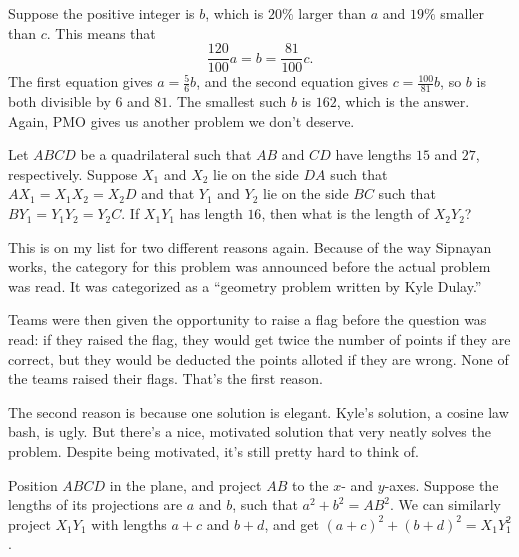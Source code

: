 \documentclass[11pt,paper=letter]{scrartcl}
\begin{document}
Suppose the positive integer is $b$, which is $20\%$ larger than $a$ and $19\%$ smaller than $c$. This means that
$$\frac{120}{100}a = b = \frac{81}{100}c.$$
The first equation gives $a = \frac56 b$, and the second equation gives $c = \frac{100}{81}b$, so $b$ is both divisible by $6$ and $81$. The smallest such $b$ is $162$, which is the answer. Again, PMO gives us another problem we don't deserve. 

\begin{probboxed}
   Let $ABCD$ be a quadrilateral such that $AB$ and $CD$ have lengths $15$ and $27$, respectively. Suppose $X_1$ and $X_2$ lie on the side $DA$ such that $AX_1 = X_1X_2 = X_2D$ and that $Y_1$ and $Y_2$ lie on the side $BC$ such that $BY_1 = Y_1Y_2 = Y_2C$. If $X_1Y_1$ has length $16$, then what is the length of $X_2Y_2$?
\end{probboxed}

This is on my list for two different reasons again. Because of the way Sipnayan works, the category for this problem was announced before the actual problem was read. It was categorized as a ``geometry problem written by Kyle Dulay.''

Teams were then given the opportunity to raise a flag before the question was read: if they raised the flag, they would get twice the number of points if they are correct, but they would be deducted the points alloted if they are wrong. None of the teams raised their flags. That's the first reason.

The second reason is because one solution is elegant. Kyle's solution, a cosine law bash, is ugly. But there's a nice, motivated solution that very neatly solves the problem. Despite being motivated, it's still pretty hard to think of.

 Position $ABCD$ in the plane, and project $AB$ to the $x$- and $y$-axes. Suppose the lengths of its projections are $a$ and $b$, such that $a^2 + b^2 = AB^2$. We can similarly project $X_1Y_1$ with lengths $a + c$ and $b + d$, and get $(a + c)^2 + (b + d)^2 = X_1Y_1^2$.
\end{document}
